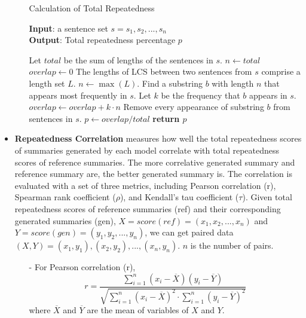 \documentclass{nle}
\theoremstyle{definition}
\begin{document}
\begin{itemize}
\begin{itemize}
		\begin{algorithm}[th]
			\caption{Calculation of Total Repeatedness}
			\label{alg:red}
			\textbf{Input}: a sentence set $s = {s_{1}, s_{2},...,s_{n}}$\\
			\textbf{Output}: Total repeatedness percentage $p$
			\begin{algorithmic}[1] %
				\STATE Let $total$ be the sum of lengths of the sentences in $s$.
				\STATE $n \leftarrow total$
				\STATE $overlap \leftarrow 0$
				\STATE The lengths of LCS between two sentences from $s$ comprise a length set $L$.
				\STATE $n \leftarrow \max(L)$.
				\STATE Find a substring $b$ with length $n$ that appears most frequently in $s$.
				\STATE Let $k$ be the frequency that $b$ appears in $s$.
				\STATE $overlap \leftarrow overlap + k\cdot n$
				\STATE Remove every appearance of substring $b$ from sentences in $s$.
				\ENDWHILE
				\STATE $p \leftarrow overlap/total$
				\STATE \textbf{return $p$} 
			\end{algorithmic}
		\end{algorithm}
	\end{itemize}
	
	\item \textbf{Repeatedness Correlation} 
	measures how well 
	the total repeatedness scores of summaries generated by each model
	correlate with total repeatedness scores of reference summaries. 
	The more correlative generated summary and reference summary are,
	the better generated summary is.
	The correlation is evaluated with a set of
	three metrics, including Pearson correlation (r),
	Spearman rank coefficient ($\rho$), and Kendall's tau coefficient ($\tau$).
	Given total repeatedness scores of reference summaries (ref) and 
	their corresponding generated summaries (gen),
	$X=score(ref)=(x_1, x_2,..., x_n)$ and 
	$Y=score(gen)=(y_1, y_2,..., y_n)$, 
	we can get paired data $(X,Y)={(x_1, y_1), (x_2, y_2),..., (x_n, y_n)}$.
	$n$ is the number of pairs.
	\begin{itemize}	
		\item[-] For Pearson correlation (r),
		\begin{equation}
			r = \frac{\sum_{i=1}^{n}(x_i - \overline{X})(y_i - \overline{Y})}
			{\sqrt{\sum_{i=1}^{n}(x_i - \overline{X})^{2}\cdot\sum_{i=1}^{n}(y_i - \overline{Y})^{2}}}
		\end{equation}
		where $\overline{X}$ and $\overline{Y}$ are the mean of variables of $X$ and $Y$.
		

\end{itemize}
\end{itemize}
\end{document}
